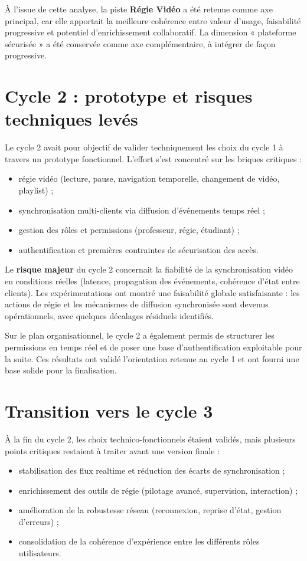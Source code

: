 \documentclass[11pt,a4paper]{report}
\begin{document}
À l'issue de cette analyse, la piste \textbf{Régie Vidéo} a été retenue comme axe principal, car elle apportait la meilleure cohérence entre valeur d'usage, faisabilité progressive et potentiel d'enrichissement collaboratif. La dimension « plateforme sécurisée » a été conservée comme axe complémentaire, à intégrer de façon progressive.

\section[Cycle 2 : prototype validé]{Cycle 2 : prototype et risques techniques levés}
Le cycle 2 avait pour objectif de valider techniquement les choix du cycle 1 à travers un prototype fonctionnel. L'effort s'est concentré sur les briques critiques :
\begin{itemize}
    \item régie vidéo (lecture, pause, navigation temporelle, changement de vidéo, playlist) ;
    \item synchronisation multi-clients via diffusion d'événements temps réel ;
    \item gestion des rôles et permissions (professeur, régie, étudiant) ;
    \item authentification et premières contraintes de sécurisation des accès.
\end{itemize}

Le \textbf{risque majeur} du cycle 2 concernait la fiabilité de la synchronisation vidéo en conditions réelles (latence, propagation des événements, cohérence d'état entre clients). Les expérimentations ont montré une faisabilité globale satisfaisante : les actions de régie et les mécanismes de diffusion synchronisée sont devenus opérationnels, avec quelques décalages résiduels identifiés.

Sur le plan organisationnel, le cycle 2 a également permis de structurer les permissions en temps réel et de poser une base d'authentification exploitable pour la suite. Ces résultats ont validé l'orientation retenue au cycle 1 et ont fourni une base solide pour la finalisation.

\section{Transition vers le cycle 3}
À la fin du cycle 2, les choix technico-fonctionnels étaient validés, mais plusieurs points critiques restaient à traiter avant une version finale :
\begin{itemize}
    \item stabilisation des flux realtime et réduction des écarts de synchronisation ;
    \item enrichissement des outils de régie (pilotage avancé, supervision, interaction) ;
    \item amélioration de la robustesse réseau (reconnexion, reprise d'état, gestion d'erreurs) ;
    \item consolidation de la cohérence d'expérience entre les différents rôles utilisateurs.
\end{itemize}
\end{document}
